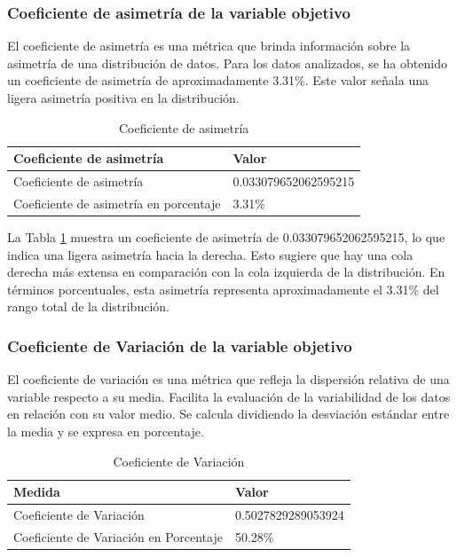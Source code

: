 \subsubsection{Coeficiente de asimetría de la variable objetivo}

El coeficiente de asimetría es una métrica que brinda información sobre la asimetría de una distribución de datos. Para los datos analizados, se ha obtenido un coeficiente de asimetría de aproximadamente 3.31\%. Este valor señala una ligera asimetría positiva en la distribución.

\begin{table}[H]
    \centering
    \caption{Coeficiente de asimetría}
    \begin{tabular}{ll}
        \hline
        \textbf{Coeficiente de asimetría}      & \textbf{Valor}       \\
        \hline
        Coeficiente de asimetría               & 0.033079652062595215 \\
        Coeficiente de asimetría en porcentaje & 3.31\%               \\
        \hline
    \end{tabular}%
    \label{tab:skewness}%
\end{table}%

La Tabla \ref{tab:skewness} muestra un coeficiente de asimetría de 0.033079652062595215, lo que indica una ligera asimetría hacia la derecha. Esto sugiere que hay una cola derecha más extensa en comparación con la cola izquierda de la distribución. En términos porcentuales, esta asimetría representa aproximadamente el 3.31\% del rango total de la distribución.

\subsubsection{Coeficiente de Variación de la variable objetivo}

El coeficiente de variación es una métrica que refleja la dispersión relativa de una variable respecto a su media. Facilita la evaluación de la variabilidad de los datos en relación con su valor medio. Se calcula dividiendo la desviación estándar entre la media y se expresa en porcentaje.

\begin{table}[H]
    \centering
    \caption{Coeficiente de Variación}
    \begin{tabular}{ll}
        \hline
        \textbf{Medida}                        & \textbf{Valor}     \\
        \hline
        Coeficiente de Variación               & 0.5027829289053924 \\
        \hline
        Coeficiente de Variación en Porcentaje & 50.28\%            \\
        \hline
    \end{tabular}%
    \label{tab:coef_variacion}%
\end{table}%

